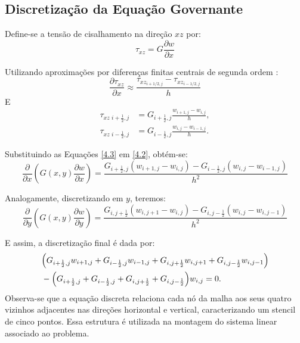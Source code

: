 \documentclass[brazil]{TCAM} %
\begin{document}
\subsection{Discretização da Equação Governante}
Define-se a tensão de cisalhamento na direção $xz$ por:
\begin{equation}
     \tau_{xz}=G\dfrac{\partial w}{\partial x}
\label{4.2}
\end{equation}

Utilizando aproximações por diferenças finitas centrais de segunda ordem \cite{leveque2007}:
$$
\frac{\partial \tau_{xz}}{\partial x} \approx \dfrac{\tau_{xz_{i+1/2,j}} - \tau_{xz_{i-1/2,j}}}{h}
$$
E
\begin{equation}
\begin{aligned}
\tau_{xz\,\,i+\frac12,j}
&=
G_{i+\frac12,j}
\frac{w_{i+1,j}-w_{i,j}}{h},
\\[2mm]
\tau_{xz\,\,i-\frac12,j}
&=
G_{i-\frac12,j}
\frac{w_{i,j}-w_{i-1,j}}{h}.
\end{aligned}
\label{4.3}
\end{equation}

Substituindo as Equações \eqref{4.3} em \eqref{4.2}, obtém-se:
\begin{equation}
    \frac{\partial}{\partial x}
\left(
G(x,y) \frac{\partial w}{\partial x}
\right) = \frac{G_{i+\frac12,j}
{(w_{i+1,j}-w_{i,j})} - G_{i-\frac12,j}
(w_{i,j}-w_{i-1,j})}{h^2}
\end{equation}

Analogamente, discretizando em $y$, teremos:
\begin{equation*}
    \frac{\partial}{\partial y}
\left(
G(x,y) \frac{\partial w}{\partial y}
\right) = \frac{G_{i,j+\frac12}
{(w_{i,j+1}-w_{i,j})} - G_{i,j-\frac12}
(w_{i,j}-w_{i,j-1})}{h^2}
\end{equation*}

E assim, a discretização final é dada por:
\begin{equation*}
\begin{aligned}
&\Bigl(
G_{i+\frac{1}{2},j}w_{i+1,j}
+G_{i-\frac{1}{2},j}w_{i-1,j}
+G_{i,j+\frac{1}{2}}w_{i,j+1}
+G_{i,j-\frac{1}{2}}w_{i,j-1}
\Bigr) \\
&-
\Bigl(
G_{i+\frac{1}{2},j}
+G_{i-\frac{1}{2},j}
+G_{i,j+\frac{1}{2}}
+G_{i,j-\frac{1}{2}}
\Bigr)w_{i,j}
=0.
\end{aligned}
\end{equation*}
Observa-se que a equação discreta relaciona cada nó da malha aos seus
quatro vizinhos adjacentes nas direções horizontal e vertical,
caracterizando um stencil de cinco pontos. Essa estrutura é utilizada na
montagem do sistema linear associado ao problema.
\end{document}
